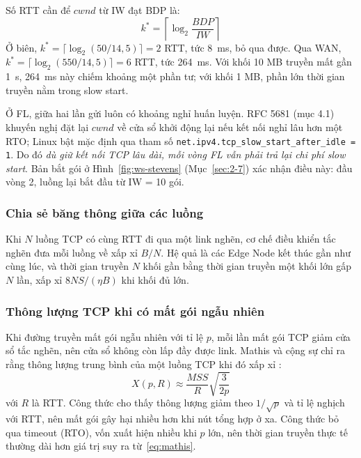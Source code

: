 Số RTT cần để $cwnd$ từ IW đạt BDP là:
\begin{equation}
    k^{*} = \left\lceil \log_2 \frac{BDP}{IW} \right\rceil
    \label{eq:kstar}
\end{equation}
Ở biên, $k^{*} = \lceil \log_2(50/14{,}5) \rceil = 2$ RTT, tức 8~ms, bỏ qua được. Qua WAN, $k^{*} = \lceil \log_2(550/14{,}5) \rceil = 6$ RTT, tức 264~ms. Với khối 10 MB truyền mất gần 1~s, 264~ms này chiếm khoảng một phần tư; với khối 1 MB, phần lớn thời gian truyền nằm trong slow start.

Ở FL, giữa hai lần gửi luôn có khoảng nghỉ huấn luyện. RFC 5681 (mục 4.1) khuyến nghị đặt lại $cwnd$ về cửa sổ khởi động lại nếu kết nối nghỉ lâu hơn một RTO; Linux bật mặc định qua tham số \nolinkurl{net.ipv4.tcp_slow_start_after_idle = 1}. Do đó \emph{dù giữ kết nối TCP lâu dài, mỗi vòng FL vẫn phải trả lại chi phí slow start}. Bản bắt gói ở Hình~\ref{fig:ws-stevens} (Mục~\ref{sec:2-7}) xác nhận điều này: đầu vòng 2, luồng lại bắt đầu từ IW = 10 gói.

\subsubsection{Chia sẻ băng thông giữa các luồng}
Khi $N$ luồng TCP có cùng RTT đi qua một link nghẽn, cơ chế điều khiển tắc nghẽn đưa mỗi luồng về xấp xỉ $B/N$. Hệ quả là các Edge Node kết thúc gần như cùng lúc, và thời gian truyền $N$ khối gần bằng thời gian truyền một khối lớn gấp $N$ lần, xấp xỉ $8NS/(\eta B)$ khi khối đủ lớn.

\subsubsection{Thông lượng TCP khi có mất gói ngẫu nhiên}
Khi đường truyền mất gói ngẫu nhiên với tỉ lệ $p$, mỗi lần mất gói TCP giảm cửa sổ tắc nghẽn, nên cửa sổ không còn lấp đầy được link. Mathis và cộng sự chỉ ra rằng thông lượng trung bình của một luồng TCP khi đó xấp xỉ \cite{mathis1997macroscopic}:
\begin{equation}
    X(p, R) \approx \frac{MSS}{R}\sqrt{\frac{3}{2p}}
    \label{eq:mathis}
\end{equation}
với $R$ là RTT. Công thức cho thấy thông lượng giảm theo $1/\sqrt{p}$ và tỉ lệ nghịch với RTT, nên mất gói gây hại nhiều hơn khi nút tổng hợp ở xa. Công thức bỏ qua timeout (RTO), vốn xuất hiện nhiều khi $p$ lớn, nên thời gian truyền thực tế thường dài hơn giá trị suy ra từ~\eqref{eq:mathis}.

